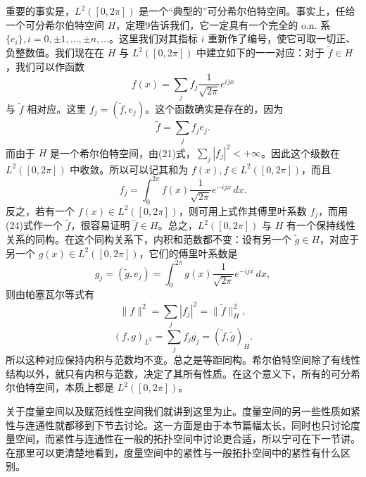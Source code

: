 重要的事实是，$L^2([0,2\pi])$ 是一个“典型的”可分希尔伯特空间。事实上，任给一个可分希尔伯特空间 $H$，定理9告诉我们，它一定具有一个完全的 o.n. 系 $\{e_i\},i=0,\pm1,\ldots,\pm n,\ldots$。这里我们对其指标 $i$ 重新作了编号，使它可取一切正、负整数值。我们现在在 $H$ 与 $L^2([0,2\pi])$ 中建立如下的一一对应：对于 $\widetilde f\in H$，我们可以作函数
\[
 f(x)=\sum_j f_j\frac1{\sqrt{2\pi}}e^{ijx}
\]
与 $\widetilde f$ 相对应。这里 $f_j=(\widetilde f,e_j)$。这个函数确实是存在的，因为
\begin{equation}
 \widetilde f=\sum_j f_j e_j.
 \tag{24}
\end{equation}
而由于 $H$ 是一个希尔伯特空间，由(21)式，$\sum_j|f_j|^2<+\infty$。因此这个级数在 $L^2([0,2\pi])$ 中收敛。所以可以记其和为 $f(x),f\in L^2([0,2\pi])$，而且
\[
 f_j=\int_0^{2\pi}f(x)\frac1{\sqrt{2\pi}}e^{-ijx}\,dx.
\]
反之，若有一个 $f(x)\in L^2([0,2\pi])$，则可用上式作其傅里叶系数 $f_j$，而用(24)式作一个 $\widetilde f$，很容易证明 $\widetilde f\in H$。总之，$L^2([0,2\pi])$ 与 $H$ 有一个保持线性关系的同构。在这个同构关系下，内积和范数都不变：设有另一个 $\widetilde g\in H$，对应于另一个 $g(x)\in L^2([0,2\pi])$，它们的傅里叶系数是
\[
 g_j=(\widetilde g,e_j)=\int_0^{2\pi}g(x)\frac1{\sqrt{2\pi}}e^{-ijx}\,dx,
\]
则由帕塞瓦尔等式有
\[
 \|f\|^2=\sum_j|f_j|^2=\|\widetilde f\|_H^2,
\]
\[
 (f,g)_{L^2}=\sum_j f_j\overline{g_j}=(\widetilde f,\widetilde g)_H.
\]
所以这种对应保持内积与范数均不变。总之是等距同构。希尔伯特空间除了有线性结构以外，就只有内积与范数，决定了其所有性质。在这个意义下，所有的可分希尔伯特空间，本质上都是 $L^2([0,2\pi])$。

关于度量空间以及赋范线性空间我们就讲到这里为止。度量空间的另一些性质如紧性与连通性就都移到下节去讨论。这一方面是由于本节篇幅太长，同时也只讨论度量空间，而紧性与连通性在一般的拓扑空间中讨论更合适，所以宁可在下一节讲。在那里可以更清楚地看到，度量空间中的紧性与一般拓扑空间中的紧性有什么区别。
